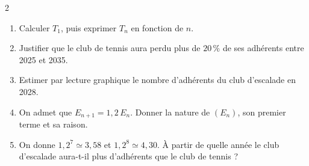\documentclass[a4paper,10pt]{article}
\renewcommand{\approx}{\simeq}
\renewenvironment{center}{\par\addvspace{3pt}\centering}{\par\addvspace{3pt}}
\begin{document}
\begin{multicols}{2}
\begin{center}
\end{center}
\begin{enumerate}[label=\arabic*.]
  \item Calculer $T_{1}$, puis exprimer $T_{n}$ en fonction de $n$.
  \item Justifier que le club de tennis aura perdu plus de $20\,\%$ de ses adhérents
        entre 2025 et 2035.
  \item Estimer par lecture graphique le nombre d'adhérents du club d'escalade en
        2028.
  \item On admet que $E_{n+1}=1{,}2\,E_{n}$. Donner la nature de $(E_{n})$, son premier
        terme et sa raison.
  \item On donne $1{,}2^{7}\approx 3{,}58$ et $1{,}2^{8}\approx 4{,}30$. À partir de
        quelle année le club d'escalade aura-t-il plus d'adhérents que le club de
        tennis ?
\end{enumerate}

\end{multicols}
\end{document}
